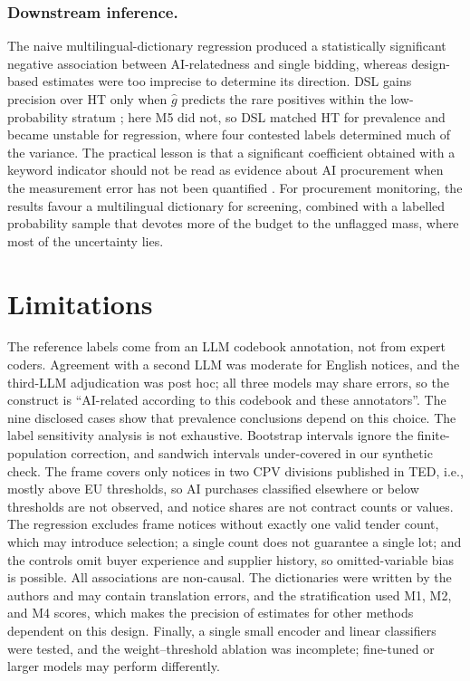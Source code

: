 \documentclass[runningheads]{llncs}
\begin{document}
\subsubsection{Downstream inference.} The naive multilingual-dictionary regression produced a statistically significant negative association between AI-relatedness and single bidding, whereas design-based estimates were too imprecise to determine its direction. DSL gains precision over HT only when $\hat{g}$ predicts the rare positives within the low-probability stratum \cite{egami2023,audinet2025}; here M5 did not, so DSL matched HT for prevalence and became unstable for regression, where four contested labels determined much of the variance. The practical lesson is that a significant coefficient obtained with a keyword indicator should not be read as evidence about AI procurement when the measurement error has not been quantified \cite{battaglia2025}. For procurement monitoring, the results favour a multilingual dictionary for screening, combined with a labelled probability sample that devotes more of the budget to the unflagged mass, where most of the uncertainty lies.

\section{Limitations}
The reference labels come from an LLM codebook annotation, not from expert coders. Agreement with a second LLM was moderate for English notices, and the third-LLM adjudication was post hoc; all three models may share errors, so the construct is ``AI-related according to this codebook and these annotators''. The nine disclosed cases show that prevalence conclusions depend on this choice. The label sensitivity analysis is not exhaustive. Bootstrap intervals ignore the finite-population correction, and sandwich intervals under-covered in our synthetic check. The frame covers only notices in two CPV divisions published in TED, i.e., mostly above EU thresholds, so AI purchases classified elsewhere or below thresholds are not observed, and notice shares are not contract counts or values. The regression excludes frame notices without exactly one valid tender count, which may introduce selection; a single count does not guarantee a single lot; and the controls omit buyer experience and supplier history, so omitted-variable bias is possible. All associations are non-causal. The dictionaries were written by the authors and may contain translation errors, and the stratification used M1, M2, and M4 scores, which makes the precision of estimates for other methods dependent on this design. Finally, a single small encoder and linear classifiers were tested, and the weight--threshold ablation was incomplete; fine-tuned or larger models may perform differently.
\end{document}
